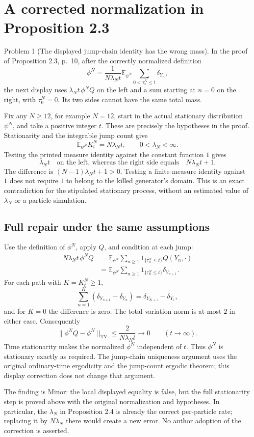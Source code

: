 \documentclass[10pt]{article}
\begin{document}
\section*{A corrected normalization in Proposition 2.3}
Problem 1 (The displayed jump-chain identity has the wrong mass).  In the proof of Proposition 2.3, p. 10, after the correctly normalized definition \[\phi^N=\frac1{N\lambda_Nt}
 \mathbb E_{\psi^N}\!\sum_{0<\tau_n^N\leq t}\delta_{Y_n},\] the next display uses \(\lambda_Nt\,\phi^NQ\) on the left and a sum starting at \(n=0\) on the right, with \(\tau_0^N=0\). Its two sides cannot have the same total mass.\par
Fix any \(N\geq12\), for example \(N=12\), start in the actual stationary distribution \(\psi^N\), and take a positive integer \(t\). These are precisely the hypotheses in the proof. Stationarity and the integrable jump count give \[\mathbb E_{\psi^N}K_t^N=N\lambda_Nt,\qquad 0<\lambda_N<\infty.\] Testing the printed measure identity against the constant function \(1\) gives \[\lambda_Nt
 \quad\text{on the left, whereas the right side equals}\quad
 N\lambda_Nt+1.\] The difference is \((N-1)\lambda_Nt+1>0\). Testing a finite-measure identity against \(1\) does not require \(1\) to belong to the killed generator’s domain. This is an exact contradiction for the stipulated stationary process, without an estimated value of \(\lambda_N\) or a particle simulation.\par
\subsection*{Full repair under the same assumptions}
Use the definition of \(\phi^N\), apply \(Q\), and condition at each jump: \[\begin{split}
 N\lambda_Nt\,\phi^NQ
 &=\mathbb E_{\psi^N}\sum_{n\geq1}
       1_{\{\tau_n^N\leq t\}}Q(Y_n,\cdot)\\
 &=\mathbb E_{\psi^N}\sum_{n\geq1}
       1_{\{\tau_n^N\leq t\}}\delta_{Y_{n+1}}.
 \end{split}\] For each path with \(K=K_t^N\geq1\), \[\sum_{n=1}^K(\delta_{Y_{n+1}}-\delta_{Y_n})
 =\delta_{Y_{K+1}}-\delta_{Y_1},\] and for \(K=0\) the difference is zero. The total variation norm is at most \(2\) in either case. Consequently \[\|\phi^NQ-\phi^N\|_{\mathrm{TV}}
 \leq\frac2{N\lambda_Nt}\longrightarrow0
 \qquad(t\to\infty).\] Time stationarity makes the normalized \(\phi^N\) independent of \(t\). Thus \(\phi^N\) is stationary exactly as required. The jump-chain uniqueness argument uses the original ordinary-time ergodicity and the jump-count ergodic theorem; this display correction does not change that argument.\par
The finding is Minor: the local displayed equality is false, but the full stationarity step is proved above with the original normalization and hypotheses. In particular, the \(\lambda_N\) in Proposition 2.4 is already the correct per-particle rate; replacing it by \(N\lambda_N\) there would create a new error. No author adoption of the correction is asserted.\par
\end{document}

